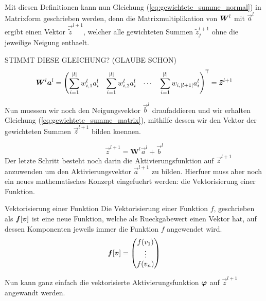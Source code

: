 \para{}
Mit diesen Definitionen kann nun Gleichung (\ref{eq:gewichtete_summe_normal}) in
Matrixform geschrieben werden, denn die Matrixmultiplikation von $\bm{W}^l$ mit
$\vec{a}^{l}$ ergibt einen Vektor $\vec{\tilde{z}}^{l+1}$, welcher alle gewichteten
Summen $\tilde{z}_j^{l+1}$ ohne die jeweilige Neigung enthaelt.

STIMMT DIESE GLEICHUNG? (GLAUBE SCHON)
\begin{equation*}
  \bm{W}^l \bm{a}^{l} = \begin{pmatrix}\displaystyle \sum_{i=1}^{|l|} w_{i,1}^l a_i^l &\displaystyle \sum_{i=1}^{|l|} w_{i,2}^l a_i^l & \cdots &\displaystyle \sum_{i=1}^{|l|} w_{i,|l+1|} a_i^l \end{pmatrix}^{\mathsf{T}} = \bm{\tilde{z}}^{l+1}
\end{equation*}
\para{}

Nun muessen wir noch den Neigungsvektor $\vec{b}^l$ draufaddieren und wir
erhalten Gleichung (\ref{eq:gewichtete_summe_matrix}), mithilfe dessen wir den
Vektor der gewichteten Summen $\vec{z}^{l+1}$ bilden koennen.

\begin{equation}\label{eq:gewichtete_summe_matrix}
  \vec{z}^{l+1} = \mathbf{W}^{l} \vec{a}^{l} + \vec{b}^{l}
\end{equation}
\para{}
Der letzte Schritt besteht noch darin die Aktivierungsfunktion auf $\vec{z}^{l+1}$
anzuwenden um den Aktivierungsvektor $\vec{a}^{l+1}$ zu bilden.
Hierfuer muss aber noch ein neues mathematisches
Konzept eingefuehrt werden: die Vektorisierung einer Funktion.
\para{}

\begin{defbox}{Vektorisierung einer Funktion}
  Die Vektorisierung einer Funktion $f$, geschrieben als $\bm{f}[\bm{v}]$ ist eine
  neue Funktion, welche als Rueckgabewert einen Vektor hat, auf dessen
  Komponenten jeweils immer die Funktion $f$ angewendet wird.
  \begin{equation*}
    \bm{f}[\bm{v}]=
    \begin{pmatrix}
      f(v_1)\\
      \vdots \\
      f(v_n)\\
    \end{pmatrix}
  \end{equation*}
\end{defbox}
\para{}

Nun kann ganz einfach die vektorisierte Aktivierungsfunktion $\bm{\varphi}$ auf
$\vec{z}^{l+1}$ angewandt werden.

